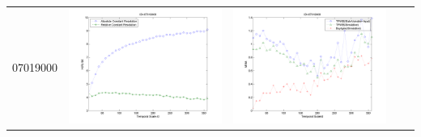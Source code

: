 \documentclass[11pt]{article}
\begin{document}
\begin{table}[H]
{\begin{tabular}{c  c   c   c  c }
07019000&\begin{minipage}{.4\textwidth}\includegraphics[width=\linewidth]{resultgraph/07019000e.png}\end{minipage}
&\begin{minipage}{.4\textwidth}\includegraphics[width=\linewidth]{resultgraph/07019000MI.png}\end{minipage}

\end{tabular}}
\end{table}
\end{document}
